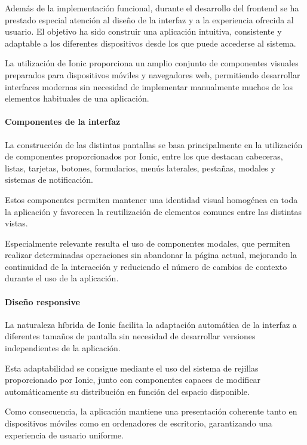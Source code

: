 Además de la implementación funcional, durante el desarrollo del frontend se ha prestado especial atención al diseño de la interfaz y a la experiencia ofrecida al usuario. El objetivo ha sido construir una aplicación intuitiva, consistente y adaptable a los diferentes dispositivos desde los que puede accederse al sistema.

La utilización de Ionic proporciona un amplio conjunto de componentes visuales preparados para dispositivos móviles y navegadores web, permitiendo desarrollar interfaces modernas sin necesidad de implementar manualmente muchos de los elementos habituales de una aplicación.

\paragraph{Componentes de la interfaz}

La construcción de las distintas pantallas se basa principalmente en la utilización de componentes proporcionados por Ionic, entre los que destacan cabeceras, listas, tarjetas, botones, formularios, menús laterales, pestañas, modales y sistemas de notificación.

Estos componentes permiten mantener una identidad visual homogénea en toda la aplicación y favorecen la reutilización de elementos comunes entre las distintas vistas.

Especialmente relevante resulta el uso de componentes modales, que permiten realizar determinadas operaciones sin abandonar la página actual, mejorando la continuidad de la interacción y reduciendo el número de cambios de contexto durante el uso de la aplicación.

\paragraph{Diseño responsive}

La naturaleza híbrida de Ionic facilita la adaptación automática de la interfaz a diferentes tamaños de pantalla sin necesidad de desarrollar versiones independientes de la aplicación.

Esta adaptabilidad se consigue mediante el uso del sistema de rejillas proporcionado por Ionic, junto con componentes capaces de modificar automáticamente su distribución en función del espacio disponible.

Como consecuencia, la aplicación mantiene una presentación coherente tanto en dispositivos móviles como en ordenadores de escritorio, garantizando una experiencia de usuario uniforme.

